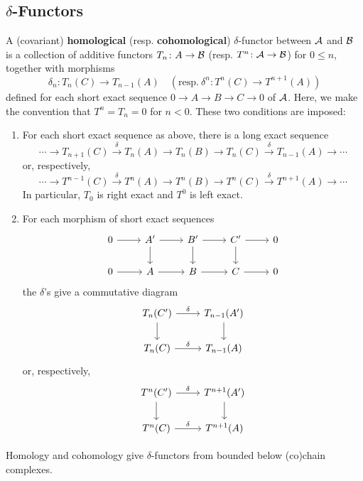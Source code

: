 \documentclass[reqno, 12pt]{amsart}
\begin{document}
\subsection{$\delta$-Functors}
\begin{definition}
  A (covariant) \textbf{homological} (resp. \textbf{cohomological}) $\delta$-functor between $\mathcal{A}$ and $\mathcal{B}$ is a collection of additive functors $T_n \colon A \to \mathcal{B}$ (resp. $T^n \colon \mathcal{A} \to \mathcal{B}$) for $0 \leq n$, together with morphisms
  $$\delta_n \colon T_n(C) \to T_{n-1}(A)\quad (\text{resp.}\ \delta^n \colon T^n(C) \to T^{n+1}(A))$$
  defined for each short exact sequence $0 \to A \to B \to C \to 0$ of $\mathcal{A}$.
  Here, we make the convention that $T^n = T_n = 0$ for $n < 0$.
  These two conditions are imposed:
  \begin{enumerate}
  \item
    For each short exact sequence as above, there is a long exact sequence
    $$\cdots \to T_{n+1}(C) \overset{\delta}\to T_n(A) \to T_n(B) \to T_n(C) \overset{\delta}\to T_{n-1}(A) \to \cdots$$
    or, respectively,
    $$\cdots \to T^{n-1}(C) \overset{\delta}\to T^n(A) \to T^n(B) \to T^n(C) \overset{\delta}\to T^{n+1}(A) \to \cdots$$
    In particular, $T_0$ is right exact and $T^0$ is left exact.
  \item
    For each morphism of short exact sequences
    $$\begin{tikzcd}
      0 \arrow{r} & A^\prime \arrow{d}\arrow{r} & B^\prime \arrow{d}\arrow{r} & C^\prime \arrow{d}\arrow{r} & 0\\
      0 \arrow{r} & A \arrow{r} & B \arrow{r} & C \arrow{r} & 0
    \end{tikzcd}$$
    the $\delta$'s give a commutative diagram
    $$\begin{tikzcd}
      T_n(C^\prime) \arrow{r}{\delta}\arrow{d} & T_{n-1}(A^\prime)\arrow{d}\\
      T_n(C) \arrow{r}{\delta} & T_{n-1}(A)
    \end{tikzcd}$$
    or, respectively,
    $$\begin{tikzcd}
      T^n(C^\prime) \arrow{r}{\delta}\arrow{d} & T^{n+1}(A^\prime)\arrow{d}\\
      T^n(C) \arrow{r}{\delta} & T^{n+1}(A)
    \end{tikzcd}$$
  \end{enumerate}
\end{definition}

\begin{example}
  Homology and cohomology give $\delta$-functors from bounded below (co)chain complexes.
\end{example}
\end{document}
